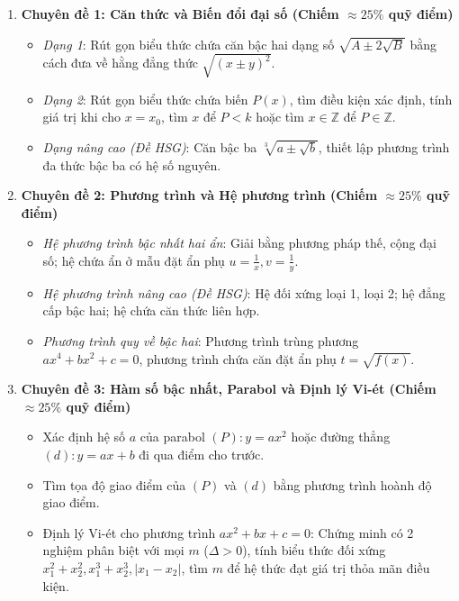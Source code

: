 \begin{enumerate}[label=\textbf{\arabic*.}]
  \item \textbf{Chuyên đề 1: Căn thức và Biến đổi đại số (Chiếm $\approx 25\%$ quỹ điểm)}
  \begin{itemize}
    \item \textit{Dạng 1}: Rút gọn biểu thức chứa căn bậc hai dạng số $\sqrt{A \pm 2\sqrt{B}}$ bằng cách đưa về hằng đẳng thức $\sqrt{(x \pm y)^2}$.
    \item \textit{Dạng 2}: Rút gọn biểu thức chứa biến $P(x)$, tìm điều kiện xác định, tính giá trị khi cho $x = x_0$, tìm $x$ để $P < k$ hoặc tìm $x \in \mathbb{Z}$ để $P \in \mathbb{Z}$.
    \item \textit{Dạng nâng cao (Đề HSG)}: Căn bậc ba $\sqrt[3]{a \pm \sqrt{b}}$, thiết lập phương trình đa thức bậc ba có hệ số nguyên.
  \end{itemize}

  \item \textbf{Chuyên đề 2: Phương trình và Hệ phương trình (Chiếm $\approx 25\%$ quỹ điểm)}
  \begin{itemize}
    \item \textit{Hệ phương trình bậc nhất hai ẩn}: Giải bằng phương pháp thế, cộng đại số; hệ chứa ẩn ở mẫu đặt ẩn phụ $u = \frac{1}{x}, v = \frac{1}{y}$.
    \item \textit{Hệ phương trình nâng cao (Đề HSG)}: Hệ đối xứng loại 1, loại 2; hệ đẳng cấp bậc hai; hệ chứa căn thức liên hợp.
    \item \textit{Phương trình quy về bậc hai}: Phương trình trùng phương $ax^4 + bx^2 + c = 0$, phương trình chứa căn đặt ẩn phụ $t = \sqrt{f(x)}$.
  \end{itemize}

  \item \textbf{Chuyên đề 3: Hàm số bậc nhất, Parabol và Định lý Vi-ét (Chiếm $\approx 25\%$ quỹ điểm)}
  \begin{itemize}
    \item Xác định hệ số $a$ của parabol $(P)\colon y = ax^2$ hoặc đường thẳng $(d)\colon y = ax + b$ đi qua điểm cho trước.
    \item Tìm tọa độ giao điểm của $(P)$ và $(d)$ bằng phương trình hoành độ giao điểm.
    \item Định lý Vi-ét cho phương trình $ax^2 + bx + c = 0$: Chứng minh có 2 nghiệm phân biệt với mọi $m$ ($\Delta > 0$), tính biểu thức đối xứng $x_1^2 + x_2^2, x_1^3 + x_2^3, |x_1 - x_2|$, tìm $m$ để hệ thức đạt giá trị thỏa mãn điều kiện.
  \end{itemize}


\end{enumerate}
